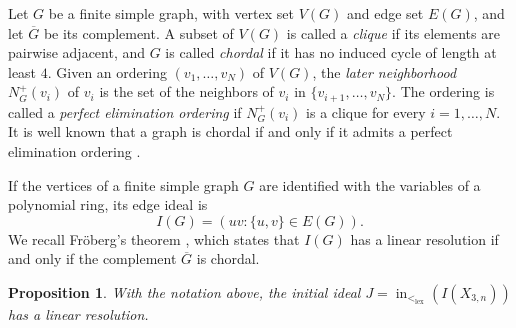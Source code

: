 \documentclass[12pt]{amsart}
\numberwithin{equation}{section}
\newtheorem{Proposition}[Theorem]{Proposition}
\begin{document}
Let $G$ be a finite simple graph, with vertex set $V(G)$ and edge set $E(G)$, and let $\overline{G}$ be its complement. A subset of $V(G)$ is called a \emph{clique} if its elements are pairwise adjacent, and $G$ is called \emph{chordal} if it has no induced cycle of length at least $4$. Given an ordering $(v_1,\ldots,v_N)$ of $V(G)$, the \emph{later neighborhood} $N_G^+(v_i)$ of $v_i$ is the set of the neighbors of $v_i$ in $\{v_{i+1},\ldots,v_N\}$. The ordering is called a \emph{perfect elimination ordering} if $N_G^+(v_i)$ is a clique for every $i=1,\ldots,N$. It is well known that a graph is chordal if and only if it admits a perfect elimination ordering \cite{FG,Rose}.

If the vertices of a finite simple graph $G$ are identified with the
variables of a polynomial ring, its edge ideal is
\[
I(G)=(uv:\{u,v\}\in E(G)).
\]
We recall Fr\"oberg's theorem \cite{F}, which states that
$I(G)$ has a linear resolution if and only if the complement
$\overline G$ is chordal.


\begin{Proposition}\label{prop:m=3linres}
With the notation above, the initial ideal $J=\operatorname{in}_{<_{\mathrm{lex}}}(I(X_{3,n}))$ has a linear resolution.
\end{Proposition}
\end{document}
